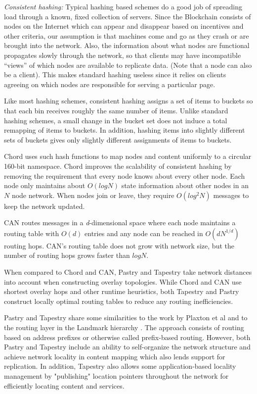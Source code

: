 {\em Consistent hashing:}
Typical hashing based schemes do a good job of spreading load through a known, fixed collection of servers. Since the
Blockchain consists of nodes on the Internet which can appear and disappear based on incentives and other criteria, our
assumption is that machines come and go as they crash or are brought into the network. Also,
the information about what nodes are functional propagates slowly through the
network, so that clients may have incompatible “views” of which nodes are available to replicate data. (Note that a
node can also be a client). This makes standard hashing useless since it relies on clients agreeing on which nodes are responsible for serving a particular
page.

Like most hashing schemes, consistent hashing assigns a set of items to buckets so that
each bin receives roughly the same number of items.  Unlike standard hashing schemes, a small change in the bucket set
does not induce a total remapping of items to buckets. In addition, hashing items into slightly different sets of
buckets gives only slightly different assignments of items to buckets. 

Chord uses such hash functions to map nodes and content uniformly to a circular 160-bit
namespace. Chord improves the scalability of consistent hashing by removing the requirement that every node knows about
every other node. Each node only maintains about \(O (log N) \) state information about other nodes in an \( N \) node
network. When nodes join or leave, they require \( O(log^2 N) \) messages to keep the network updated.

CAN routes messages in a {\em d}-dimensional space where each node maintains a routing table with \(O(d)\) entries and
any node can be reached in \(O(dN^{1/d})\) routing hops. CAN's routing table does not grow with network size, but the
number of routing hops grows faster than \(log N\).

When compared to Chord and CAN, Pastry and Tapestry take network distances into account when constructing overlay
topologies. While Chord and CAN use shortest overlay hops and other runtime heuristics, both Tapestry and Pastry
construct locally optimal routing tables to reduce any routing inefficiencies. 

Pastry and Tapestry share some similarities to the work by Plaxton et al \cite{Plaxton_1997} and to the routing layer in
the Landmark hierarchy \cite{Tsuchiya_1988}. The approach consists of routing based on address prefixes or otherwise
called prefix-based routing. However, both Pastry and Tapestry include an ability to self-organize the network structure
and achieve network locality in content mapping which also lends support for replication.
In addition, Tapestry also allows some application-based locality management by "publishing" location pointers
throughout the network for efficiently locating content and services.

